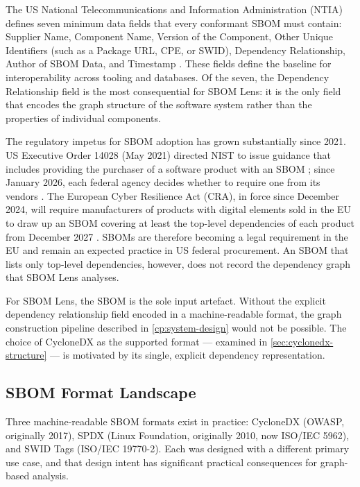 The US National Telecommunications and Information Administration (NTIA) defines seven minimum data fields that every conformant SBOM must contain: Supplier Name, Component Name, Version of the Component, Other Unique Identifiers (such as a Package URL, CPE, or SWID), Dependency Relationship, Author of SBOM Data, and Timestamp \citep{NTIA2021}. These fields define the baseline for interoperability across tooling and databases. Of the seven, the Dependency Relationship field is the most consequential for SBOM Lens: it is the only field that encodes the graph structure of the software system rather than the properties of individual components.

The regulatory impetus for SBOM adoption has grown substantially since 2021. US Executive Order 14028 (May 2021) directed NIST to issue guidance that includes providing the purchaser of a software product with an SBOM \citep{EO14028}; since January 2026, each federal agency decides whether to require one from its vendors \citep{OMB_M2605}. The European Cyber Resilience Act (CRA), in force since December 2024, will require manufacturers of products with digital elements sold in the EU to draw up an SBOM covering at least the top-level dependencies of each product from December 2027 \citep{CRA2024}. SBOMs are therefore becoming a legal requirement in the EU and remain an expected practice in US federal procurement. An SBOM that lists only top-level dependencies, however, does not record the dependency graph that SBOM Lens analyses.

For SBOM Lens, the SBOM is the sole input artefact. Without the explicit dependency relationship field encoded in a machine-readable format, the graph construction pipeline described in \autoref{cp:system-design} would not be possible. The choice of CycloneDX as the supported format --- examined in \autoref{sec:cyclonedx-structure} --- is motivated by its single, explicit dependency representation.


\subsection{SBOM Format Landscape}
\label{sec:sbom-formats}

Three machine-readable SBOM formats exist in practice: CycloneDX (OWASP, originally 2017), SPDX (Linux Foundation, originally 2010, now ISO/IEC 5962), and SWID Tags (ISO/IEC 19770-2). Each was designed with a different primary use case, and that design intent has significant practical consequences for graph-based analysis.

